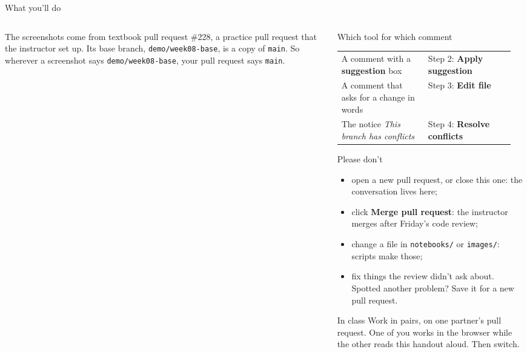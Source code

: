 \documentclass{handout}
\begin{document}
\begin{frame}{What you'll do}
\begin{columns}[T]
\begin{column}{0.57\textwidth}
      The screenshots come from textbook pull request \#228, a practice pull
      request that the instructor set up. Its base branch,
      \texttt{demo/week08-base}, is a copy of \texttt{main}. So wherever a
      screenshot says \texttt{demo/week08-base}, your pull request says
      \texttt{main}.
    \end{column}
    \begin{column}{0.39\textwidth}
      \begin{block}{Which tool for which comment}
        \small
        \begin{tabular}{@{}>{\raggedright\arraybackslash}p{0.46\linewidth}%
                        >{\raggedright\arraybackslash}p{0.46\linewidth}@{}}
          A comment with a \textbf{suggestion} box & Step 2: \textbf{Apply suggestion}\\ \addlinespace[4pt]
          A comment that asks for a change in words & Step 3: \textbf{Edit file}\\ \addlinespace[4pt]
          The notice \textit{This branch has conflicts} & Step 4: \textbf{Resolve conflicts}
        \end{tabular}
      \end{block}
      \begin{alertblock}{Please don't}
        \small
        \begin{itemize}
          \item open a new pull request, or close this one: the conversation
            lives here;
          \item click \textbf{Merge pull request}: the instructor merges
            after Friday's code review;
          \item change a file in \texttt{notebooks/} or \texttt{images/}:
            scripts make those;
          \item fix things the review didn't ask about. Spotted another
            problem? Save it for a new pull request.
        \end{itemize}
      \end{alertblock}
      \begin{exampleblock}{In class}
        \small Work in pairs, on one partner's pull request. One of you
        works in the browser while the other reads this handout aloud. Then
        switch.
      \end{exampleblock}
    \end{column}
  \end{columns}
\end{frame}
\end{document}
